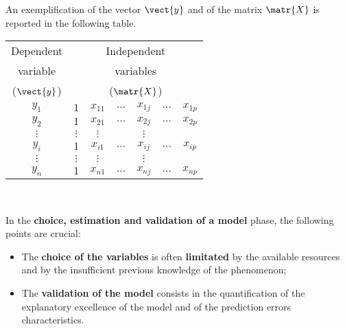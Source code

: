 \begin{frame}
  \vspace*{.25cm}
  An exemplification of the vector $ \vect{y} $ and of the matrix $ \matr{X} $ is reported in the following table.
  \vspace*{.5cm}
  \begin{center}
    \begin{tabular}{|c||c|c|c|c|c|c|}
      \hline
      Dependent & \multicolumn{6}{|c|}{Independent} \\
      variable & \multicolumn{6}{|c|}{variables} \\
      ($ \vect{y} $) & \multicolumn{6}{|c|}{($ \matr{X} $)} \\
      \hline
      \hline
      $y_1$ & $1$ & \hspace*{.25cm}$x_{11}$\hspace*{.25cm} & \hspace*{.25cm}$\dots$\hspace*{.25cm} & \hspace*{.25cm}$x_{1j}$\hspace*{.25cm} & \hspace*{.25cm}$\dots$\hspace*{.25cm} & \hspace*{.25cm}$x_{1p}$\hspace*{.25cm} \\
      \hline
      $y_2$ & $1$ & $x_{21}$ & $\dots$ & $x_{2j}$ & $\dots$ & $x_{2p}$ \\
      \hline
      $\vdots$ & $\vdots$ & $\vdots$ &  & $\vdots$ &  &  \\
      \hline
      $y_i$ & $1$ & $x_{i1}$ & $\dots$ & $x_{ij}$ & $\dots$ & $x_{ip}$ \\
      \hline
      $\vdots$ & $\vdots$ & $\vdots$ &  & $\vdots$ &  &  \\
      \hline
      $y_n$ & $1$ & $x_{n1}$ & $\dots$ & $x_{nj}$ & $\dots$ & $x_{np}$ \\
      \hline
    \end{tabular}\\
  \end{center}
\end{frame}

\begin{frame}
  \vspace*{.5cm}
  In the \textbf{choice, estimation and validation of a model} phase, the following points are crucial:
  \vspace*{.5cm}
  \begin{itemize}
    \item The \textbf{choice of the variables} is often \textbf{limitated} by the available resources and by the insufficient previous knowledge of the phenomenon;
    \vspace*{.5cm}
    \item The \textbf{validation of the model} consists in the quantification of the explanatory excellence of the model and of the prediction errors characteristics.
  \end{itemize}
\end{frame}

